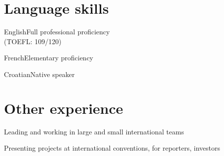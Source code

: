 \documentclass{tccv}
\begin{document}
\section{Language skills}
\begin{factlist}
\item{English}{Full professional proficiency \\ (TOEFL: 109/120)}
\item{French}{Elementary proficiency} 
\item{Croatian}{Native speaker}
\end{factlist}
\vspace*{-0.5cm}
%
\section{Other experience}
\begin{factlist}
\item{ }{Leading and working in large and small international teams}
\item{ }{Presenting projects at international conventions, for reporters, investors}
\end{factlist}
\end{document}
